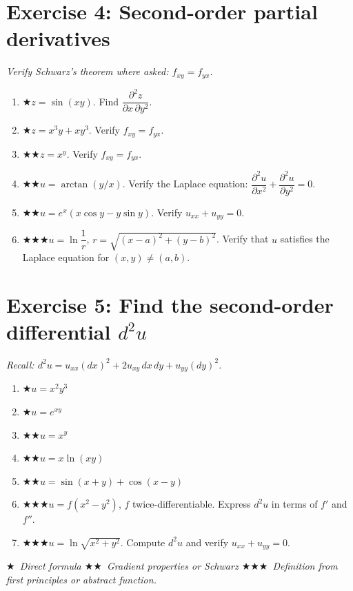 \documentclass[12pt,a4paper]{article}
\newcommand{\easy}{{\color{green!60!black}$\bigstar$}}
\newcommand{\medium}{{\color{orange}$\bigstar\bigstar$}}
\newcommand{\hard}{{\color{red}$\bigstar\bigstar\bigstar$}}
\begin{document}
\section*{Exercise 4: Second-order partial derivatives}

\emph{Verify Schwarz's theorem where asked: $f_{xy}=f_{yx}$.}

\begin{enumerate}[leftmargin=*, label=(\alph*)]
\item \easy\quad $z=\sin(xy)$. Find $\dfrac{\partial^2 z}{\partial x\,\partial y^2}$.
\item \easy\quad $z = x^3 y + x y^3$. Verify $f_{xy} = f_{yx}$.
\item \medium\quad $z=x^y$. Verify $f_{xy}=f_{yx}$.
\item \medium\quad $u=\arctan(y/x)$. Verify the Laplace equation:
$\dfrac{\partial^2 u}{\partial x^2}+\dfrac{\partial^2 u}{\partial y^2}=0$.
\item \medium\quad $u = e^x(x\cos y - y\sin y)$. Verify $u_{xx}+u_{yy}=0$.
\item \hard\quad $u=\ln\dfrac{1}{r}$, $r=\sqrt{(x-a)^2+(y-b)^2}$.
Verify that $u$ satisfies the Laplace equation for $(x,y)\ne(a,b)$.
\end{enumerate}

\section*{Exercise 5: Find the second-order differential $d^2 u$}

\emph{Recall: $d^2 u = u_{xx}(dx)^2+2u_{xy}\,dx\,dy+u_{yy}(dy)^2$.}

\begin{enumerate}[leftmargin=*, label=(\alph*)]
\item \easy\quad $u = x^2 y^3$
\item \easy\quad $u = e^{xy}$
\item \medium\quad $u = x^y$
\item \medium\quad $u = x\ln(xy)$
\item \medium\quad $u = \sin(x+y) + \cos(x-y)$
\item \hard\quad $u = f(x^2-y^2)$, $f$ twice-differentiable.
Express $d^2 u$ in terms of $f'$ and $f''$.
\item \hard\quad $u = \ln\!\sqrt{x^2+y^2}$. Compute $d^2 u$ and verify $u_{xx}+u_{yy}=0$.
\end{enumerate}

\bigskip
\begin{center}
\small\itshape
\easy\ Direct formula\quad
\medium\ Gradient properties or Schwarz\quad
\hard\ Definition from first principles or abstract function.
\end{center}
\end{document}
